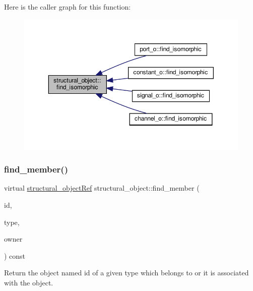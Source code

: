 Here is the caller graph for this function\+:
\nopagebreak
\begin{figure}[H]
\begin{center}
\leavevmode
\includegraphics[width=350pt]{d8/da3/classstructural__object_a87756f7dab3d9a866c81b96b88e11380_icgraph}
\end{center}
\end{figure}
\mbox{\label{classstructural__object_a3a8b2d38c2b5666700053a72868bb6b2}} 
\subsubsection{\texorpdfstring{find\+\_\+member()}{find\_member()}}
{\footnotesize\ttfamily virtual \hyperlink{structural__objects_8hpp_a8ea5f8cc50ab8f4c31e2751074ff60b2}{structural\+\_\+object\+Ref} structural\+\_\+object\+::find\+\_\+member (\begin{DoxyParamCaption}\item[{const std\+::string \&}]{id,  }\item[{\hyperlink{structural__objects_8hpp_acf52399aecacb7952e414c5746ce6439}{so\+\_\+kind}}]{type,  }\item[{const \hyperlink{structural__objects_8hpp_a8ea5f8cc50ab8f4c31e2751074ff60b2}{structural\+\_\+object\+Ref}}]{owner }\end{DoxyParamCaption}) const\hspace{0.3cm}{\ttfamily [pure virtual]}}



Return the object named id of a given type which belongs to or it is associated with the object. 


